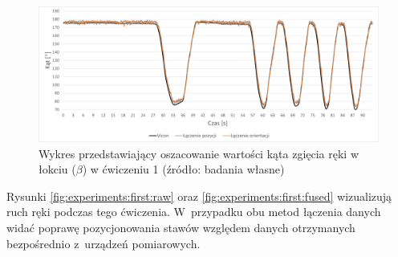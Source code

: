 \begin{savenotes}
	\begin{figure}[!htb]
		\centering
		\includegraphics[width=\textwidth]{images/100/angle.png}
		\caption{Wykres przedstawiający oszacowanie wartości kąta zgięcia ręki w łokciu ($\beta$) w ćwiczeniu 1 (źródło: badania własne)}
		\label{fig:experiments:first:angle}
	\end{figure}
\end{savenotes}
												
Rysunki \ref{fig:experiments:first:raw} oraz \ref{fig:experiments:first:fused} wizualizują ruch ręki podczas tego ćwiczenia. W~przypadku obu metod łączenia danych widać poprawę pozycjonowania stawów względem danych otrzymanych bezpośrednio z~urządzeń pomiarowych. 
												
